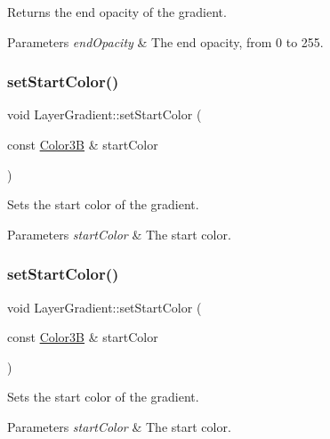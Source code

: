 Returns the end opacity of the gradient.


\begin{DoxyParams}{Parameters}
{\em end\+Opacity} & The end opacity, from 0 to 255. \\
\hline
\end{DoxyParams}
\mbox{\label{classLayerGradient_a80ff3a646b83447f94e617150c560e08}} 
\subsubsection{\texorpdfstring{set\+Start\+Color()}{setStartColor()}\hspace{0.1cm}{\footnotesize\ttfamily [1/2]}}
{\footnotesize\ttfamily void Layer\+Gradient\+::set\+Start\+Color (\begin{DoxyParamCaption}\item[{const \hyperlink{structColor3B}{Color3B} \&}]{start\+Color }\end{DoxyParamCaption})}

Sets the start color of the gradient.


\begin{DoxyParams}{Parameters}
{\em start\+Color} & The start color. \\
\hline
\end{DoxyParams}
\mbox{\label{classLayerGradient_a80ff3a646b83447f94e617150c560e08}} 
\subsubsection{\texorpdfstring{set\+Start\+Color()}{setStartColor()}\hspace{0.1cm}{\footnotesize\ttfamily [2/2]}}
{\footnotesize\ttfamily void Layer\+Gradient\+::set\+Start\+Color (\begin{DoxyParamCaption}\item[{const \hyperlink{structColor3B}{Color3B} \&}]{start\+Color }\end{DoxyParamCaption})}

Sets the start color of the gradient.


\begin{DoxyParams}{Parameters}
{\em start\+Color} & The start color. \\
\hline
\end{DoxyParams}
\mbox{\label{classLayerGradient_a435d90e278ecd977feb7f0057572ed1d}} 

